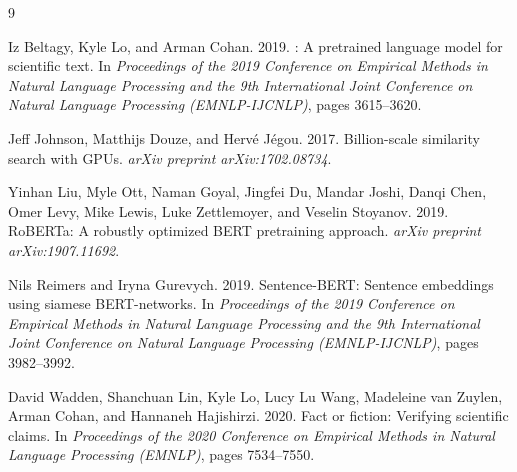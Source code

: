 \documentclass[11pt]{article}
\begin{document}
\begin{thebibliography}{9}

Iz Beltagy, Kyle Lo, and Arman Cohan. 2019.
: A pretrained language model for scientific text.
\newblock In \textit{Proceedings of the 2019 Conference on Empirical Methods in Natural Language Processing and the 9th International Joint Conference on Natural Language Processing (EMNLP-IJCNLP)}, pages 3615--3620.

Jeff Johnson, Matthijs Douze, and Herv\'{e} J\'{e}gou. 2017.
\newblock Billion-scale similarity search with GPUs.
\newblock \textit{arXiv preprint arXiv:1702.08734}.

Yinhan Liu, Myle Ott, Naman Goyal, Jingfei Du, Mandar Joshi, Danqi Chen, Omer Levy, Mike Lewis, Luke Zettlemoyer, and Veselin Stoyanov. 2019.
\newblock RoBERTa: A robustly optimized {BERT} pretraining approach.
\newblock \textit{arXiv preprint arXiv:1907.11692}.

Nils Reimers and Iryna Gurevych. 2019.
\newblock Sentence-BERT: Sentence embeddings using siamese {BERT}-networks.
\newblock In \textit{Proceedings of the 2019 Conference on Empirical Methods in Natural Language Processing and the 9th International Joint Conference on Natural Language Processing (EMNLP-IJCNLP)}, pages 3982--3992.

David Wadden, Shanchuan Lin, Kyle Lo, Lucy Lu Wang, Madeleine van Zuylen, Arman Cohan, and Hannaneh Hajishirzi. 2020.
\newblock Fact or fiction: Verifying scientific claims.
\newblock In \textit{Proceedings of the 2020 Conference on Empirical Methods in Natural Language Processing (EMNLP)}, pages 7534--7550.

\end{thebibliography}
\end{document}
